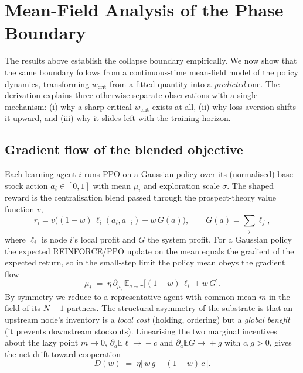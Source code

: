\documentclass[11pt]{article}
\newcommand{\wcrit}{w_{\mathrm{crit}}}
\begin{document}
\section{Mean-Field Analysis of the Phase Boundary}
\label{sec:meanfield}

The results above establish the collapse boundary empirically. We now show
that the same boundary follows from a continuous-time mean-field model of
the policy dynamics, transforming $\wcrit$ from a fitted quantity into a
\emph{predicted} one. The derivation explains three otherwise separate
observations with a single mechanism: (i) why a sharp critical $\wcrit$
exists at all, (ii) why loss aversion shifts it upward, and (iii) why it
slides left with the training horizon.

\subsection{Gradient flow of the blended objective}
Each learning agent $i$ runs PPO on a Gaussian policy over its (normalised)
base-stock action $a_i\in[0,1]$ with mean $\mu_i$ and exploration scale
$\sigma$. The shaped reward is the centralisation blend passed through the
prospect-theory value function $v$,
\begin{equation}
  r_i = v\!\big((1-w)\,\ell_i(a_i,a_{-i}) + w\,G(a)\big),
  \qquad G(a)=\textstyle\sum_j \ell_j ,
  \label{eq:blend}
\end{equation}
where $\ell_i$ is node $i$'s local profit and $G$ the system profit. For a
Gaussian policy the expected REINFORCE/PPO update on the mean equals the
gradient of the expected return, so in the small-step limit the policy mean
obeys the gradient flow
\begin{equation}
  \dot\mu_i \;=\; \eta\,\partial_{\mu_i}\,
  \mathbb{E}_{a\sim\pi}\!\big[(1-w)\,\ell_i + w\,G\big].
  \label{eq:flow}
\end{equation}
By symmetry we reduce to a representative agent with common mean $m$ in the
field of its $N-1$ partners. The structural asymmetry of the substrate is
that an upstream node's inventory is a \emph{local cost} (holding,
ordering) but a \emph{global benefit} (it prevents downstream stockouts).
Linearising the two marginal incentives about the lazy point $m\!\to\!0$,
$\partial_a\mathbb{E}\ell\!\to\!-c$ and $\partial_a\mathbb{E}G\!\to\!+g$
with $c,g>0$, gives the net drift toward cooperation
\begin{equation}
  D(w) \;=\; \eta\big[\,w\,g-(1-w)\,c\,\big].
  \label{eq:drift}
\end{equation}
\end{document}
